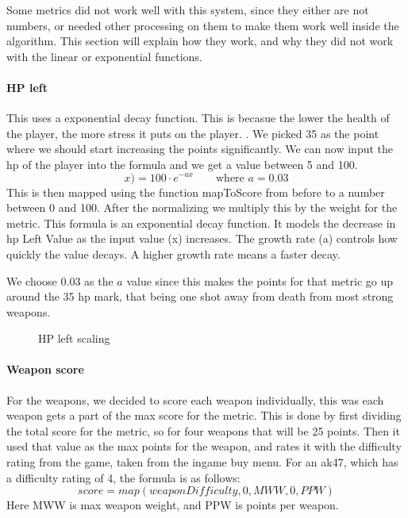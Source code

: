 Some metrics did not work well with this system, since they either are not numbers, or needed other processing on them to make them work well inside the algorithm. This section will explain how they work, and why they did not work with the linear or exponential functions.
\paragraph{HP left}

This uses a exponential decay function. This is becasue the lower the health of the player, the more stress it puts on the player. . We picked 35 as the point where we should start increasing the points significantly. We can now input the \acrshort{hp} of the player into the formula and we get a value between 5 and 100.            
$$x) = 100 \cdot e^{-ax}  \qquad \text{where } a = 0.03$$
This is then mapped using the function mapToScore from before to a number between 0 and 100. After the normalizing we multiply this by the weight for the metric. 
This formula is an exponential decay function. It models the decrease in \acrshort{hp} Left Value as the input value (x) increases. The growth rate (a) controls how quickly the value decays. A higher growth rate means a faster decay. 

We choose 0.03 as the $a$ value since this makes the points for that metric go up around the 35 \acrshort{hp} mark, that being one shot away from death from most strong weapons.


\begin{figure}
    \centering
    \caption{HP left scaling}
    \label{fig:hp-left}
\end{figure}

\paragraph{Weapon score}
For the weapons, we decided to score each weapon individually, this was each weapon gets a part of the max score for the metric. This is done by first dividing the total score for the metric, so for four weapons that will be 25 points. Then it used that value as the max points for the weapon, and rates it with the difficulty rating from the game, taken from the ingame buy menu. For an ak47, which has a difficulty rating of 4, the formula is as follows: $$ score = map(weaponDifficulty, 0, MWW, 0, PPW) $$ Here MWW is max weapon weight, and PPW is points per weapon.

